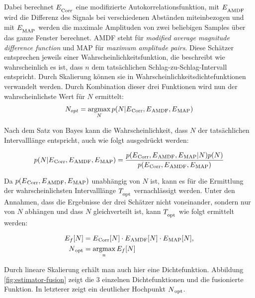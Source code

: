  	Dabei berechnet $E_\textsubscript{Corr}$ eine modifizierte Autokorrelationsfunktion, mit $E_\textsubscript{AMDF}$ wird die Differenz des Signals bei verschiedenen Abständen miteinbezogen und mit $E_\textsubscript{MAP}$ werden die maximale Amplituden von zwei beliebigen Samples über das ganze Fenster berechnet. AMDF steht für \textit{modified average magnitude difference function} und MAP für \textit{maximum amplitude pairs}. Diese Schätzer entsprechen jeweils einer Wahrscheinlichkeitsfunktion, die beschreibt wie wahrscheinlich es ist, dass $n$ dem tatsächlichen Schlag-zu-Schlag-Intervall entspricht. Durch Skalierung können sie in Wahrscheinlichkeitsdichtefunktionen verwandelt werden. Durch Kombination dieser drei Funktionen wird nun der wahrscheinlichste Wert für $N$ ermittelt:
 	\[ N_{opt} = \operatorname*{argmax}_{N} p(N|E\textsubscript{Corr}, E\textsubscript{AMDF}, E\textsubscript{MAP}) \]
 	
	Nach dem Satz von Bayes kann die Wahrscheinlichkeit, dass $N$ der tatsächlichen Intervalllänge entspricht, auch wie folgt ausgedrückt werden:
	
	\[
		p(N|E\textsubscript{Corr}, E\textsubscript{AMDF}, E\textsubscript{MAP}) = \frac{p(E\textsubscript{Corr}, E\textsubscript{AMDF}, E\textsubscript{MAP} | N) p(N)}{p(E\textsubscript{Corr}, E\textsubscript{AMDF}, E\textsubscript{MAP})}
	\]
	
	Da $p(E\textsubscript{Corr}, E\textsubscript{AMDF}, E\textsubscript{MAP})$ unabhängig von $N$ ist, kann es für die Ermittlung der wahrscheinlichsten Intervalllänge $T_\textsubscript{opt}$ vernachlässigt werden. Unter den Annahmen, dass die Ergebnisse der drei Schätzer nicht voneinander, sondern nur von $N$ abhängen und dass $N$ gleichverteilt ist, kann $T_\textsubscript{opt}$ wie folgt ermittelt werden: %
	
	\begin{align*}
		E_f[N] &= E\textsubscript{Corr}[N] \cdot E\textsubscript{AMDF}[N] \cdot E\textsubscript{MAP}[N],\\
		N\textsubscript{opt} &= \operatorname*{argmax}_{n} E_f[N]	
	\end{align*}
	
	Durch lineare Skalierung erhält man auch hier eine Dichtefunktion. Abbildung \ref{fig:estimator-fusion} zeigt die 3 einzelnen Dichtefunktionen und die fusionierte Funktion. In letzterer zeigt ein deutlicher Hochpunkt $N\textsubscript{opt}$.
	
